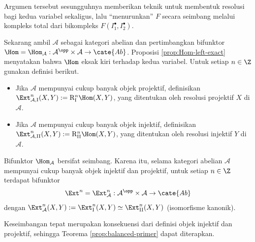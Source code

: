 \begin{catatan}\label{rem:balanced-primer}
Argumen tersebut sesungguhnya memberikan teknik untuk membentuk resolusi bagi
kedua variabel sekaligus, lalu ``menurunkan'' $F$ secara seimbang melalui kompleks
total dari bikompleks $F(I_1^\bullet,I_2^\bullet)$.
\end{catatan}

Sekarang ambil $\mathcal{A}$ sebagai kategori abelian dan pertimbangkan
bifunktor $\Hom=\Hom_{\mathcal{A}}:\mathcal{A}^{\opp}\times\mathcal{A}
\to\cate{Ab}$. Proposisi \ref{prop:Hom-left-exact} menyatakan bahwa
$\Hom$ eksak kiri terhadap kedua variabel. Untuk setiap $n\in\Z$ gunakan
definisi berikut.

\begin{itemize}
\item Jika $\mathcal{A}$ mempunyai cukup banyak objek projektif, definisikan
$\Ext^n_{\mathcal{A},\mathrm{I}}(X,Y):=\mathrm{R}^n_{\mathrm{I}}\Hom(X,Y)$,
yang ditentukan oleh resolusi projektif $X$ di $\mathcal{A}$.
\item Jika $\mathcal{A}$ mempunyai cukup banyak objek injektif, definisikan
$\Ext^n_{\mathcal{A},\mathrm{II}}(X,Y):=\mathrm{R}^n_{\mathrm{II}}\Hom(X,Y)$,
yang ditentukan oleh resolusi injektif $Y$ di $\mathcal{A}$.
\end{itemize}

\begin{definisiproposisi}\label{def:Ext-classical}
Bifunktor $\Hom_{\mathcal{A}}$ bersifat seimbang. Karena itu, selama kategori
abelian $\mathcal{A}$ mempunyai cukup banyak objek injektif dan projektif, untuk
setiap $n\in\Z$ terdapat bifunktor
\[
\Ext^n=\Ext^n_{\mathcal{A}}:\mathcal{A}^{\opp}\times\mathcal{A}\to\cate{Ab}
\]
dengan
$\Ext^n_{\mathcal{A}}(X,Y):=\Ext^n_{\mathrm{I}}(X,Y)\simeq
\Ext^n_{\mathrm{II}}(X,Y)$ (isomorfisme kanonik).
\end{definisiproposisi}

\begin{bukti}
Keseimbangan tepat merupakan konsekuensi dari definisi objek injektif dan
projektif, sehingga Teorema \ref{prop:balanced-primer} dapat diterapkan.
\end{bukti}

